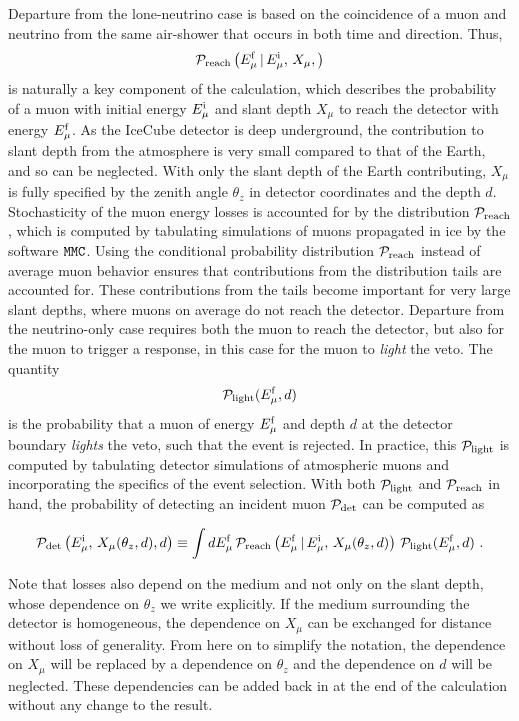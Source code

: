 Departure from the lone-neutrino case is based on the coincidence of a muon and neutrino from the same air-shower that occurs in both time and direction.
Thus,
\begin{equation}
\label{eq:preach}
{\cal P}_{\rm reach}\left(E_{\mu}^{\rm f} \, | \, E_{\mu}^{\rm i} , \, X_\mu, \right)
\end{equation}
is naturally a key component of the calculation, which describes the probability of a muon with initial energy $E_{\mu}^{\rm i}$ and slant depth $X_\mu$ to reach the detector with energy $E_{\mu}^{\rm f}$.
As the IceCube detector is deep underground, the contribution to slant depth from the atmosphere is very small compared to that of the Earth, and so can be neglected.
With only the slant depth of the Earth contributing, $X_\mu$ is fully specified by the zenith angle $\theta_z$ in detector coordinates and the depth $d$.
Stochasticity of the muon energy losses is accounted for by the distribution ${\cal P}_{\rm reach}$, which is computed by tabulating simulations of muons propagated in ice by the software $\texttt{MMC}$.
Using the conditional probability distribution ${\cal P}_{\rm reach}$ instead of average muon behavior ensures that contributions from the distribution tails are accounted for.
These contributions from the tails become important for very large slant depths, where muons on average do not reach the detector.
Departure from the neutrino-only case requires both the muon to reach the detector, but also for the muon to trigger a response, in this case for the muon to {\it light} the veto.
The quantity
\begin{equation}
\label{eq:plight}
{\cal P}_{\rm light}(E_{\mu}^{\rm f},d)
\end{equation}
is the probability that a muon of energy $E_{\mu}^{\rm f}$ and depth $d$ at the detector boundary {\it lights} the veto, such that the event is rejected.
In practice, this ${\cal P}_{\rm light}$ is computed by tabulating detector simulations of atmospheric muons and incorporating the specifics of the event selection.
With both ${\cal P}_{\rm light}$ and ${\cal P}_{\rm reach}$ in hand, the probability of detecting an incident muon ${\cal P}_{\rm det}$ can be computed as 

\begin{equation}
\label{eq:PrPl}
{\cal P}_{\rm det}\left(E_{\mu}^{\rm i} , \, X_\mu(\theta_z, d), d\right) \equiv \int dE_{\mu}^{\rm f} \, {\cal P}_{\rm reach}\left(E_{\mu}^{\rm f} \, | \, E_{\mu}^{\rm i} , \, X_\mu(\theta_z, d)\right) \, {\cal P}_{\rm light} (E_{\mu}^{\rm f}, d) ~.
\end{equation}

Note that losses also depend on the medium and not only on the slant depth, whose dependence on $\theta_z$ we write explicitly. If the medium surrounding the detector is homogeneous, the dependence on $X_\mu$ can be exchanged for distance without loss of generality.
From here on to simplify the notation, the dependence on $X_\mu$ will be replaced by a dependence on $\theta_z$ and the dependence on $d$ will be neglected.
These dependencies can be added back in at the end of the calculation without any change to the result.

